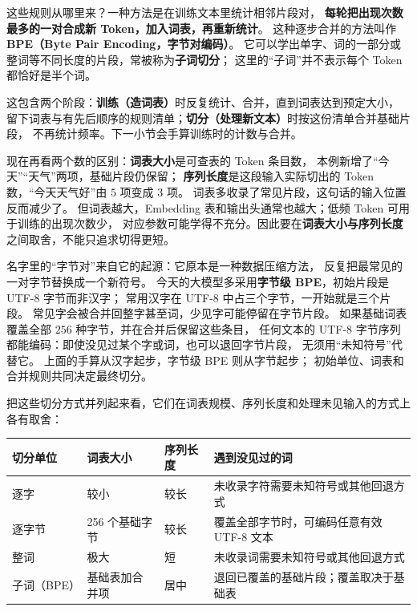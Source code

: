 \label{concept:bpe}
这些规则从哪里来？一种方法是在训练文本里统计相邻片段对，
\textbf{每轮把出现次数最多的一对合成新 Token，加入词表，再重新统计}。
这种逐步合并的方法叫作 \textbf{BPE（Byte Pair Encoding，字节对编码）}。
它可以学出单字、词的一部分或整词等不同长度的片段，常被称为\textbf{子词切分}；
这里的“子词”并不表示每个 Token 都恰好是半个词。

这包含两个阶段：\textbf{训练（造词表）}时反复统计、合并，直到词表达到预定大小，
留下词表与有先后顺序的规则清单；\textbf{切分（处理新文本）}时按这份清单合并基础片段，
不再统计频率。下一小节会手算训练时的计数与合并。

现在再看两个数的区别：\textbf{词表大小}是可查表的 Token 条目数，
本例新增了“今天”“天气”两项，基础片段仍保留；
\textbf{序列长度}是这段输入实际切出的 Token 数，“今天天气好”由 $5$ 项变成 $3$ 项。
词表多收录了常见片段，这句话的输入位置反而减少了。
但词表越大，Embedding 表和输出头通常也越大；低频 Token 可用于训练的出现次数少，
对应参数可能学得不充分。因此要在\textbf{词表大小与序列长度}之间取舍，不能只追求切得更短。

名字里的“字节对”来自它的起源：它原本是一种数据压缩方法，
反复把最常见的一对字节替换成一个新符号。
今天的大模型多采用\textbf{字节级 BPE}，初始片段是 UTF-8 字节而非汉字；
常用汉字在 UTF-8 中占三个字节，一开始就是三个片段。
常见字会被合并回整字甚至词，少见字可能停留在字节片段。
如果基础词表覆盖全部 $256$ 种字节，并在合并后保留这些条目，
任何文本的 UTF-8 字节序列都能编码：即使没见过某个字或词，也可以退回字节片段，
无须用“未知符号”代替它。
上面的手算从汉字起步，字节级 BPE 则从字节起步；
初始单位、词表和合并规则共同决定最终切分。

把这些切分方式并列起来看，它们在词表规模、序列长度和处理未见输入的方式上各有取舍：

\begin{center}\small
{}
\begin{tabularx}{\linewidth}{@{}p{26mm}p{32mm}p{25mm}X@{}}
\toprule
切分单位 & 词表大小 & 序列长度 & 遇到没见过的词\\\midrule
逐字 & 较小 & 较长 & 未收录字符需要未知符号或其他回退方式\\
逐字节 & 256 个基础字节 & 较长 & 覆盖全部字节时，可编码任意有效 UTF-8 文本\\
整词 & 极大 & 短 & 未收录词需要未知符号或其他回退方式\\
子词（BPE） & 基础表加合并项 & 居中 & 退回已覆盖的基础片段；覆盖取决于基础表\\
\bottomrule
\end{tabularx}
\end{center}

